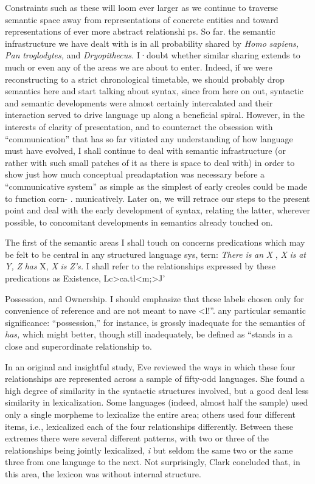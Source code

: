 Constraints such as these will loom ever larger as we continue to traverse semantic space away from representations of concrete entities and toward representations of ever more abstract relationshi ps. So far. the semantic infrastructure we have dealt with is in all probability shared by \textit{Homo} \textit{sapiens,} \textit{Pan} \textit{troglodytes,} and \textit{Dryopithecus.} I·doubt whether similar sharing extends to much or even any of the areas we are about to enter. Indeed, if we were reconstructing to a strict chrono\-logical timetable, we should probably drop semantics here and start talking about syntax, since from here on out, syntactic and semantic developments were almost certainly intercalated and their interaction served to drive language up along a beneficial spiral. However, in the interests of clarity of presentation, and to counteract the obsession with ``communication'' that has so far vitiated any understanding
of how language must have evolved, I shall continue to deal with semantic infrastructure (or rather with such small patches of it as there is space to deal with) in order to show just how much conceptual preadaptation was necessary before a ``communicative system'' as
simple as the simplest of early creoles could be made to function corn- . municatively. Later on, we will retrace our steps to the present point and deal with the early development of syntax, relating the latter, wherever possible, to concomitant developments in semantics already touched on.

The first of the semantic areas I shall touch on concerns predica\-tions which may be felt to be central in any structured language sys, tern: \textit{There }\textit{is} \textit{an} \textit{X} , \textit{X }\textit{is }\textit{at }\textit{Y,} \textit{Z }\textit{has} X, \textit{X }\textit{is} \textit{Z's. }I shall refer to the relationships expressed by these predications as Existence, Lc{\textgreater}ca.tl{\textless}m;{\textgreater}J'

Possession, and Ownership. I should emphasize that these labels
chosen only for convenience of reference and are not meant to nave {\textless}l!''. any particular semantic significance: ``possession,'' for instance, is grossly inadequate for the semantics of \textit{has,} which might better, though still inadequately, be defined as ``stands in a close and superordinate relationship to.{\textquotedbl}

In an original and insightful study, Eve \citet{Clark1970} reviewed the ways in which these four relationships are represented across a sample of fifty-odd languages. She found a high degree of similarity in the syntactic structures involved, but a good deal less similarity in lexicalization. Some languages (indeed, almost half the sample) used only a single morpheme to lexicalize the entire area; others used four different items, i.e., lexicalized each of the four relationships differently. Between these extremes there were several different patterns, with two or three of the relationships being jointly lexicalized, \textit{i} but seldom the same two or the same three from one language to the next. Not surprisingly, Clark concluded that, in this area, the lexicon was without internal structure.

